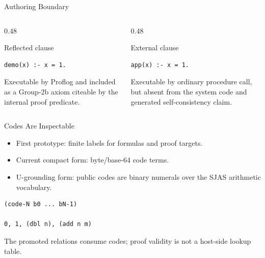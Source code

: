 \documentclass[aspectratio=169]{beamer}
\begin{document}
\begin{frame}[fragile]{Authoring Boundary}
  \begin{columns}[T,onlytextwidth]
    \begin{column}{0.48\textwidth}
      \begin{exampleblock}{Reflected clause}
\begin{verbatim}
demo(x) :- x = 1.
\end{verbatim}
        \small
        Executable by Proflog and included as a Group-2b axiom citeable by
        the internal proof predicate.
      \end{exampleblock}
    \end{column}
    \begin{column}{0.48\textwidth}
      \begin{alertblock}{External clause}
\begin{verbatim}
app(x) :- x = 1.
\end{verbatim}
        \small
        Executable by ordinary procedure call, but absent from the system code
        and generated self-consistency claim.
      \end{alertblock}
    \end{column}
  \end{columns}
\end{frame}

\begin{frame}[fragile]{Codes Are Inspectable}
  \begin{itemize}
    \item First prototype: finite labels for formulas and proof targets.
    \item Current compact form: byte/base-64 code terms.
    \item U-grounding form: public codes are binary numerals over the SJAS
          arithmetic vocabulary.
  \end{itemize}

  \vspace{0.7em}
\begin{verbatim}
(code-N b0 ... bN-1)

0, 1, (dbl n), (add n m)
\end{verbatim}

  \vspace{0.2em}
  The promoted relations consume codes; proof validity is not a host-side
  lookup table.
\end{frame}
\end{document}

